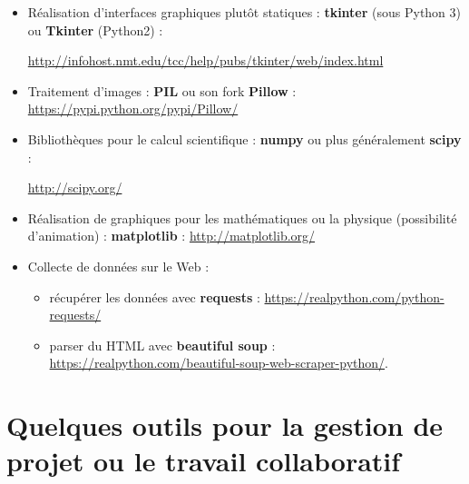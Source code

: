 \documentclass[a4paper, french, 12pt]{article}  %
\begin{document}
\begin{itemize}[label=]



\item Réalisation d'interfaces graphiques plut\^ot statiques : \textbf{tkinter} (sous Python 3) ou \textbf{Tkinter} (Python2) :

\url{http://infohost.nmt.edu/tcc/help/pubs/tkinter/web/index.html}
\item Traitement d'images : \textbf{PIL} ou son fork \textbf{Pillow} : \url{https://pypi.python.org/pypi/Pillow/}

 \item Bibliothèques pour le calcul scientifique : \textbf{numpy} ou plus généralement \textbf{scipy} : 
 
 \url{http://scipy.org/}
 
 \item Réalisation de graphiques pour les mathématiques ou la physique (possibilité d'animation) : \textbf{matplotlib} :
  \url{http://matplotlib.org/}
 
\item Collecte de données sur le Web :

\begin{itemize}
\item  récupérer les données avec \textbf{requests} : \url{https://realpython.com/python-requests/} 
\item    \og{} parser \fg{} du HTML  avec \textbf{beautiful soup} : 
\url{https://realpython.com/beautiful-soup-web-scraper-python/}.
\end{itemize}

\end{itemize}


\section{Quelques outils pour la gestion de projet ou le travail collaboratif}
\end{document}
